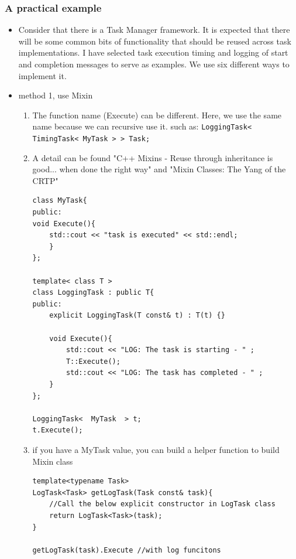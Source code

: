 \documentclass[a4paper,11pt,twoside]{book}
\begin{document}
\subsubsection{A practical example}
\begin{itemize}
	\item  Consider that there is a Task Manager framework. It is expected that there will be some common bits of functionality that should be reused across task implementations. I have selected task execution timing and logging of start and completion messages to serve as examples. We use six different ways to implement it.
	
	\item method 1, use Mixin
	\begin{enumerate}
		
		\item The function name (Execute) can be different. Here, we use the same name because we can recursive use it. such as: \texttt{LoggingTask< TimingTask< MyTask > > Task;}
		
		\item A detail can be found "C++ Mixins - Reuse through inheritance is good... when done the right way" and "Mixin Classes: The Yang of the CRTP"
		
\begin{lstlisting}[numbers=none]
class MyTask{
public:
void Execute(){
	std::cout << "task is executed" << std::endl;
	}
};
		
template< class T >
class LoggingTask : public T{
public:
	explicit LoggingTask(T const& t) : T(t) {}
			
	void Execute(){
		std::cout << "LOG: The task is starting - " ;
		T::Execute(); 
		std::cout << "LOG: The task has completed - " ;
	}
};
		
LoggingTask<  MyTask  > t;
t.Execute();
\end{lstlisting}
		
		\item if you have a MyTask value, you can build a helper function to build Mixin class 
\begin{lstlisting}[numbers=none]
template<typename Task>
LogTask<Task> getLogTask(Task const& task){
	//Call the below explicit constructor in LogTask class
	return LogTask<Task>(task);
}
		
getLogTask(task).Execute //with log funcitons
\end{lstlisting}
		
	\end{enumerate}
	

\end{itemize}
\end{document}
